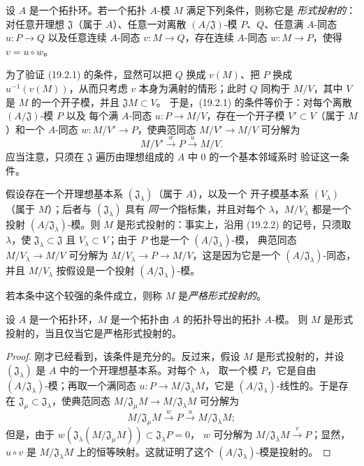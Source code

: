 \begin{definition}[19.2.1]
\label{0.19.2.1-fr}
设 $A$ 是一个拓扑环。若一个拓扑 $A$-模 $M$ 满足下列条件，则称它是
\emph{形式投射的}：对任意开理想 $\mathfrak J$（属于 $A$）、任意一对离散
$(A/\mathfrak J)$-模 $P$、$Q$、任意满 $A$-同态 $u:P\to Q$ 以及任意连续
$A$-同态 $v:M\to Q$，存在连续 $A$-同态 $w:M\to P$，使得
$v=u\circ w$。
\end{definition}

\begin{env}[19.2.2]
\label{0.19.2.2-fr}
为了验证 (19.2.1) 的条件，显然可以把 $Q$ 换成 $v(M)$、把 $P$ 换成
$u^{-1}(v(M))$，从而只考虑 $v$ 本身为满射的情形；此时 $Q$ 同构于
$M/V$，其中 $V$ 是 $M$ 的一个开子模，并且 $\mathfrak JM\subset V$。
于是，(19.2.1) 的条件等价于：对每个离散 $(A/\mathfrak J)$-模 $P$ 以及
每个满 $A$-同态 $u:P\to M/V$，存在一个开子模 $V'\subset V$（属于
$M$）和一个 $A$-同态 $w:M/V'\to P$，使典范同态 $M/V'\to M/V$
可分解为
\[
  M/V'\xrightarrow{w}P\xrightarrow{u}M/V.
\]
应当注意，只须在 $\mathfrak J$ 遍历由理想组成的 $A$ 中 0 的一个基本邻域系时
验证这一条件。
\end{env}

\begin{env}[19.2.3]
\label{0.19.2.3-fr}
假设存在一个开理想基本系 $(\mathfrak J_\lambda)$（属于 $A$），以及一个
开子模基本系 $(V_\lambda)$（属于 $M$）；后者与 $(\mathfrak J_\lambda)$ 具有
\emph{同一个}指标集，并且对每个 $\lambda$，$M/V_\lambda$ 都是一个投射
$(A/\mathfrak J_\lambda)$-模。则 $M$ 是形式投射的：事实上，沿用
(19.2.2) 的记号，只须取 $\lambda$，使 $\mathfrak J_\lambda\subset\mathfrak J$
且 $V_\lambda\subset V$；由于 $P$ 也是一个 $(A/\mathfrak J_\lambda)$-模，
典范同态 $M/V_\lambda\to M/V$ 可分解为
$M/V_\lambda\to P\to M/V$，这是因为它是一个
$(A/\mathfrak J_\lambda)$-同态，并且 $M/V_\lambda$ 按假设是一个投射
$(A/\mathfrak J_\lambda)$-模。

若本条中这个较强的条件成立，则称 $M$ 是\emph{严格形式投射的}。
\end{env}

\begin{proposition}[19.2.4]
\label{0.19.2.4-fr}
设 $A$ 是一个拓扑环，$M$ 是一个拓扑由 $A$ 的拓扑导出的拓扑 $A$-模。
则 $M$ 是形式投射的，当且仅当它是严格形式投射的。
\end{proposition}


\begin{proof}
刚才已经看到，该条件是充分的。反过来，假设 $M$ 是形式投射的，并设
$(\mathfrak J_\lambda)$ 是 $A$ 中的一个开理想基本系。对每个 $\lambda$，
取一个模 $P$，它是自由 $(A/\mathfrak J_\lambda)$-模；再取一个满同态
$u:P\to M/\mathfrak J_\lambda M$，它是
$(A/\mathfrak J_\lambda)$-线性的。于是存在
$\mathfrak J_\mu\subset\mathfrak J_\lambda$，使典范同态
$M/\mathfrak J_\mu M\to M/\mathfrak J_\lambda M$ 可分解为
\[
  M/\mathfrak J_\mu M\xrightarrow{w}P\xrightarrow{u}M/\mathfrak J_\lambda M;
\]
但是，由于
$w(\mathfrak J_\lambda(M/\mathfrak J_\mu M))\subset\mathfrak J_\lambda P=0$，
$w$ 可分解为 $M/\mathfrak J_\lambda M\xrightarrow{v}P$；显然，
$u\circ v$ 是 $M/\mathfrak J_\lambda M$ 上的恒等映射。这就证明了这个
$(A/\mathfrak J_\lambda)$-模是投射的。
\end{proof}

